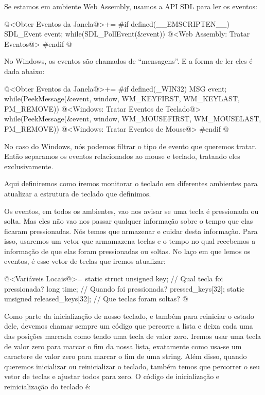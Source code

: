 Se estamos em ambiente Web Assembly, usamos a API SDL para ler os
eventos:

\iniciocodigo
@<Obter Eventos da Janela@>+=
#if defined(__EMSCRIPTEN__)
SDL_Event event;
while(SDL_PollEvent(&event)){
  @<Web Assembly: Tratar Eventos@>
}
#endif
@
\fimcodigo

No Windows, os eventos são chamados de ``mensagens''. E a forma de ler
eles é dada abaixo:

\iniciocodigo
@<Obter Eventos da Janela@>+=
#if defined(_WIN32)
MSG event;
while(PeekMessage(&event, window, WM_KEYFIRST, WM_KEYLAST, PM_REMOVE)){
  @<Windows: Tratar Eventos de Teclado@>
}
while(PeekMessage(&event, window, WM_MOUSEFIRST, WM_MOUSELAST, PM_REMOVE)){
  @<Windows: Tratar Eventos de Mouse@>
}
#endif
@
\fimcodigo

No caso do Windows, nós podemos filtrar o tipo de evento que queremos
tratar. Então separamos os eventos relacionados ao mouse e teclado,
tratando eles exclusivamente.


Aqui definiremos como iremos monitorar o teclado em diferentes
ambientes para atualizar a estrutura de teclado que definimos.

Os eventos, em todos os ambientes, vao nos avisar se uma tecla é
pressionada ou solta. Mas eles não vao nos passar qualquer informação
sobre o tempo que elas ficaram pressionadas. Nós temos que armazenar e
cuidar desta informação. Para isso, usaremos um vetor que armamazena
teclas e o tempo no qual recebemos a informação de que elas foram
pressionadas ou soltas. No laço em que lemos os eventos, é esse vetor
de teclas que iremos atualizar:

\iniciocodigo
@<Variáveis Locais@>=
static struct{
  unsigned key; // Qual tecla foi pressionada?
  long time;    // Quando foi pressionada?
} pressed_keys[32];
static unsigned released_keys[32]; // Que teclas foram soltas?
@
\fimcodigo

Como parte da inicialização de nosso teclado, e também para reiniciar
o estado dele, devemos chamar sempre um código que percorre a lista e
deixa cada uma das posições marcada como tendo uma tecla de valor
zero. Iremos usar uma tecla de valor zero para marcar o fim da nossa
lista, exatamente como usa-se um caractere de valor zero para marcar o
fim de uma string. Além disso, quando queremos inicializar ou
reinicializar o teclado, também temos que percorrer o seu vetor de
teclas e ajustar todos para zero. O código de inicialização e
reinicialização do teclado é:

